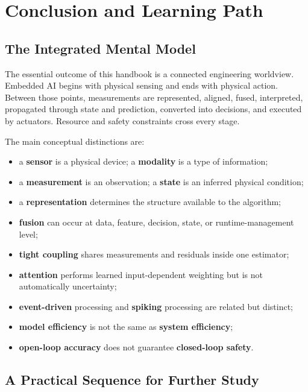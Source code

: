 \chapter{Conclusion and Learning Path}
\label{chap:conclusion}

\section{The Integrated Mental Model}

The essential outcome of this handbook is a connected engineering worldview. Embedded AI begins with physical sensing and ends with physical action. Between those points, measurements are represented, aligned, fused, interpreted, propagated through state and prediction, converted into decisions, and executed by actuators. Resource and safety constraints cross every stage.

The main conceptual distinctions are:

\begin{itemize}
    \item a \textbf{sensor} is a physical device; a \textbf{modality} is a type of information;
    \item a \textbf{measurement} is an observation; a \textbf{state} is an inferred physical condition;
    \item a \textbf{representation} determines the structure available to the algorithm;
    \item \textbf{fusion} can occur at data, feature, decision, state, or runtime-management level;
    \item \textbf{tight coupling} shares measurements and residuals inside one estimator;
    \item \textbf{attention} performs learned input-dependent weighting but is not automatically uncertainty;
    \item \textbf{event-driven} processing and \textbf{spiking} processing are related but distinct;
    \item \textbf{model efficiency} is not the same as \textbf{system efficiency};
    \item \textbf{open-loop accuracy} does not guarantee \textbf{closed-loop safety}.
\end{itemize}

\section{A Practical Sequence for Further Study}

